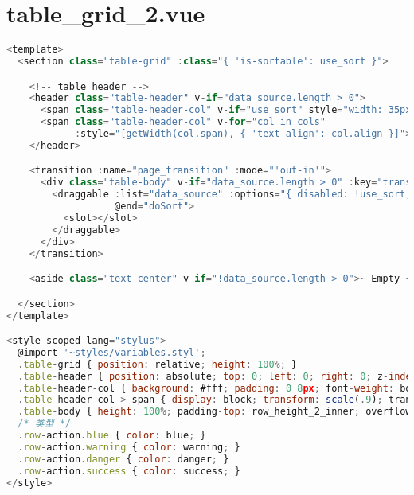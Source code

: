\section{table\_grid\_2.vue}


\begin{lstlisting}[language=JavaScript]
<template>
  <section class="table-grid" :class="{ 'is-sortable': use_sort }">

    <!-- table header -->
    <header class="table-header" v-if="data_source.length > 0">
      <span class="table-header-col" v-if="use_sort" style="width: 35px;"><span>排序</span></span>
      <span class="table-header-col" v-for="col in cols"
            :style="[getWidth(col.span), { 'text-align': col.align }]"><span v-html="col.col_title"></span></span>
    </header>

    <transition :name="page_transition" :mode="'out-in'">
      <div class="table-body" v-if="data_source.length > 0" :key="transition_key">
        <draggable :list="data_source" :options="{ disabled: !use_sort, animation: 150, handle: '.drag-handle' }"
                   @end="doSort">
          <slot></slot>
        </draggable>
      </div>
    </transition>

    <aside class="text-center" v-if="!data_source.length > 0">~ Empty ~</aside>

  </section>
</template>

<style scoped lang="stylus">
  @import '~styles/variables.styl';
  .table-grid { position: relative; height: 100%; }
  .table-header { position: absolute; top: 0; left: 0; right: 0; z-index: 100; display: flex; line-height: row_height_2_inner; white-space: nowrap; box-shadow: 0 1px 2px -1px rgba(0, 0, 0, .3); }
  .table-header-col { background: #fff; padding: 0 8px; font-weight: bold; }
  .table-header-col > span { display: block; transform: scale(.9); transform-origin: 0 100%; }
  .table-body { height: 100%; padding-top: row_height_2_inner; overflow-y: auto; }
  /* 类型 */
  .row-action.blue { color: blue; }
  .row-action.warning { color: warning; }
  .row-action.danger { color: danger; }
  .row-action.success { color: success; }
</style>


\end{lstlisting}
